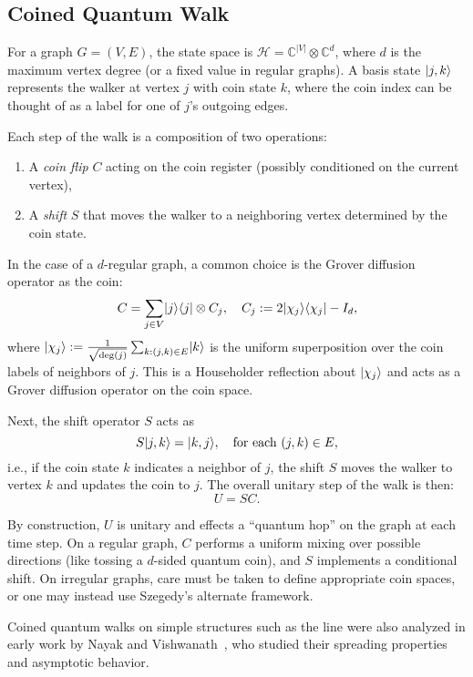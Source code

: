 \documentclass[12pt]{report}
\begin{document}
\subsection{Coined Quantum Walk}

For a graph $G=(V,E)$, the state space is $\mathcal{H} = \mathbb{C}^{|V|} \otimes \mathbb{C}^d$, where $d$ is the maximum vertex degree (or a fixed value in regular graphs). A basis state $\lvert j,k\rangle$ represents the walker at vertex $j$ with coin state $k$, where the coin index can be thought of as a label for one of $j$'s outgoing edges.

Each step of the walk is a composition of two operations:
\begin{enumerate}
    \item A \emph{coin flip} $C$ acting on the coin register (possibly conditioned on the current vertex),
    \item A \emph{shift} $S$ that moves the walker to a neighboring vertex determined by the coin state.
\end{enumerate}

In the case of a $d$-regular graph, a common choice is the Grover diffusion operator as the coin:
\[
C = \sum_{j \in V} \lvert j\rangle\langle j\rvert \otimes C_j, \quad C_j := 2 \lvert\chi_j\rangle\langle\chi_j\rvert - I_d,
\]
where $\lvert\chi_j\rangle := \frac{1}{\sqrt{\deg(j)}} \sum_{k : (j,k) \in E} \lvert k\rangle$ is the uniform superposition over the coin labels of neighbors of $j$. This is a Householder reflection about $\lvert\chi_j\rangle$ and acts as a Grover diffusion operator on the coin space.

Next, the shift operator $S$ acts as
\[
S \lvert j,k\rangle = \lvert k,j\rangle, \quad \text{for each } (j,k) \in E,
\]
i.e., if the coin state $k$ indicates a neighbor of $j$, the shift $S$ moves the walker to vertex $k$ and updates the coin to $j$. The overall unitary step of the walk is then:
\[
U = S C.
\]

By construction, $U$ is unitary and effects a “quantum hop” on the graph at each time step. On a regular graph, $C$ performs a uniform mixing over possible directions (like tossing a $d$-sided quantum coin), and $S$ implements a conditional shift. On irregular graphs, care must be taken to define appropriate coin spaces, or one may instead use Szegedy’s alternate framework.

Coined quantum walks on simple structures such as the line were also analyzed in early work by Nayak and Vishwanath~\cite{Nayak2000}, who studied their spreading properties and asymptotic behavior.
\end{document}
